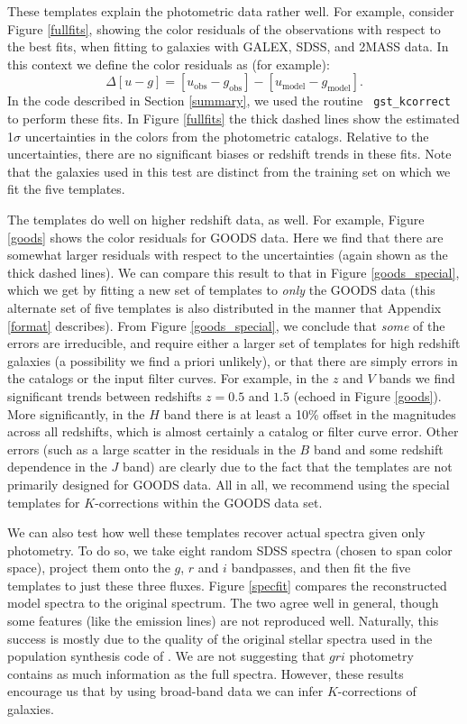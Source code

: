 \documentclass[10pt,preprint]{aastex}
\begin{document}
These templates explain the photometric data rather well. For example,
consider Figure \ref{fullfits}, showing the color residuals of the
observations with respect to the best fits, when fitting to galaxies
with GALEX, SDSS, and 2MASS data. In this context we define the color
residuals as (for example):
\begin{equation}
\Delta [u-g] = [u_{\mathrm{obs}}- g_{\mathrm{obs}}] -
[u_{\mathrm{model}}- g_{\mathrm{model}}] .
\end{equation}
In the code described in Section \ref{summary}, we used the routine {\tt
gst\_kcorrect} to perform these fits.  In Figure \ref{fullfits} the
thick dashed lines show the estimated 1$\sigma$ uncertainties in the
colors from the photometric catalogs. Relative to the uncertainties,
there are no significant biases or redshift trends in these fits. Note
that the galaxies used in this test are distinct from the training set
on which we fit the five templates.

The templates do well on higher redshift data, as well. For example,
Figure \ref{goods} shows the color residuals for GOODS data. Here we
find that there are somewhat larger residuals with respect to the
uncertainties (again shown as the thick dashed lines). We can compare
this result to that in Figure \ref{goods_special}, which we get by
fitting a new set of templates to {\it only} the GOODS data (this
alternate set of five templates is also distributed in the manner that
Appendix \ref{format} describes). From Figure \ref{goods_special}, we
conclude that {\it some} of the errors are irreducible, and require
either a larger set of templates for high redshift galaxies (a
possibility we find a priori unlikely), or that there are simply
errors in the catalogs or the input filter curves. For example, in the
$z$ and $V$ bands we find significant trends between redshifts $z=0.5$
and $1.5$ (echoed in Figure \ref{goods}). More significantly, in the
$H$ band there is at least a 10\% offset in the magnitudes across all
redshifts, which is almost certainly a catalog or filter curve
error. Other errors (such as a large scatter in the residuals in the
$B$ band and some redshift dependence in the $J$ band) are clearly due
to the fact that the templates are not primarily designed for GOODS
data. All in all, we recommend using the special templates for
$K$-corrections within the GOODS data set.

We can also test how well these templates recover actual spectra given
only photometry. To do so, we take eight random SDSS spectra (chosen
to span color space), project them onto the $g$, $r$ and $i$
bandpasses, and then fit the five templates to just these three
fluxes.  Figure \ref{specfit} compares the reconstructed model spectra
to the original spectrum. The two agree well in general, though some
features (like the emission lines) are not reproduced well.
Naturally, this success is mostly due to the quality of the original
stellar spectra used in the population synthesis code of
\citet{bruzual03a}. We are not suggesting that $gri$ photometry
contains as much information as the full spectra. However, these
results encourage us that by using broad-band data we can infer
$K$-corrections of galaxies.
\end{document}
